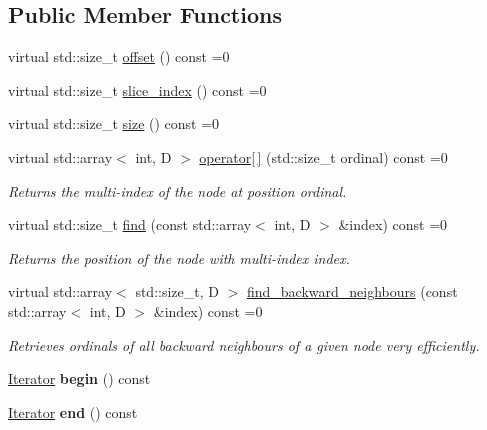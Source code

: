 \subsection*{Public Member Functions}
\begin{DoxyCompactItemize}
\item 
virtual std\+::size\+\_\+t \hyperlink{classwaveblocks_1_1_shape_slice_a1304d3ca2c080b8258ddff233c2b1809}{offset} () const =0
\item 
virtual std\+::size\+\_\+t \hyperlink{classwaveblocks_1_1_shape_slice_aba345671b0dd4058d4b5de285d904689}{slice\+\_\+index} () const =0
\item 
virtual std\+::size\+\_\+t \hyperlink{classwaveblocks_1_1_shape_slice_a08b3fd43798dea6e4487e4b41d926f30}{size} () const =0
\item 
virtual std\+::array$<$ int, D $>$ \hyperlink{classwaveblocks_1_1_shape_slice_a1e7363a71777b680cafe370ea4be2fb1}{operator\mbox{[}$\,$\mbox{]}} (std\+::size\+\_\+t ordinal) const =0
\begin{DoxyCompactList}\small\item\em Returns the multi-\/index of the node at position {\itshape ordinal}. \end{DoxyCompactList}\item 
virtual std\+::size\+\_\+t \hyperlink{classwaveblocks_1_1_shape_slice_ab38e2bf39cd8d9a2c9a1028622b077b1}{find} (const std\+::array$<$ int, D $>$ \&index) const =0
\begin{DoxyCompactList}\small\item\em Returns the position of the node with multi-\/index {\ttfamily index}. \end{DoxyCompactList}\item 
virtual std\+::array$<$ std\+::size\+\_\+t, D $>$ \hyperlink{classwaveblocks_1_1_shape_slice_a724b4713602473f6a0b712cf32592ead}{find\+\_\+backward\+\_\+neighbours} (const std\+::array$<$ int, D $>$ \&index) const =0
\begin{DoxyCompactList}\small\item\em Retrieves ordinals of all backward neighbours of a given node very efficiently. \end{DoxyCompactList}\item 
\hypertarget{classwaveblocks_1_1_shape_slice_a843c26f6500f8497a641ef9815c8603e}{}\hyperlink{classwaveblocks_1_1_shape_slice_1_1_iterator}{Iterator} {\bfseries begin} () const \label{classwaveblocks_1_1_shape_slice_a843c26f6500f8497a641ef9815c8603e}

\item 
\hypertarget{classwaveblocks_1_1_shape_slice_a9c23b0136051e2e229be8035cc87ffa9}{}\hyperlink{classwaveblocks_1_1_shape_slice_1_1_iterator}{Iterator} {\bfseries end} () const \label{classwaveblocks_1_1_shape_slice_a9c23b0136051e2e229be8035cc87ffa9}

\end{DoxyCompactItemize}


